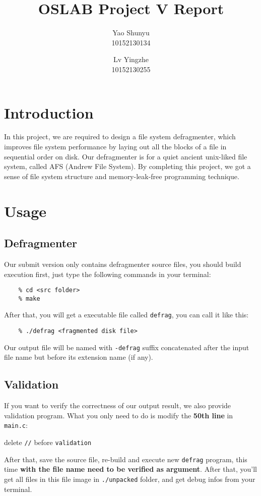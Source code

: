 \documentclass{article}
\title{OSLAB Project V Report}
\author{
	Yao Shunyu\\
	10152130134
	\and
	Lv Yingzhe\\
	10152130255
}
\newcommand{\inline}[1]{\colorbox{shadecolor}{\lstinline{#1}}}
\begin{document}
\maketitle
	
\section{Introduction}
In this project, we are required to design a file system defragmenter, which improves file system performance by laying out all the blocks of a file in sequential order on disk. Our defragmenter is for a quiet ancient unix-liked file system, called AFS (Andrew File System). By completing this project, we got a sense of file system structure and memory-leak-free programming technique.
	
\section{Usage}
\subsection{Defragmenter}
Our submit version only contains defragmenter source files, you should build execution first, just type the following commands in your terminal:
\begin{lstlisting}
	% cd <src folder>
	% make
\end{lstlisting}
After that, you will get a executable file called \inline{defrag}, you can call it like this:
\begin{lstlisting}
	% ./defrag <fragmented disk file>
\end{lstlisting}
Our output file will be named with \inline{-defrag} suffix concatenated after the input file name but before its extension name (if any).
\subsection{Validation}
If you want to verify the correctness of our output result, we also provide validation program. What you only need to do is modify the \textbf{50th line} in \inline{main.c}: 
\begin{center}
	delete \inline{//} before \inline{validation}
\end{center} 
After that, save the source file, re-build and execute new \texttt{defrag} program, this time \textbf{with the file name need to be verified as argument}. After that, you'll get all files in this file image in \inline{./unpacked} folder, and get debug infos from your terminal.
\newpage
\end{document}
